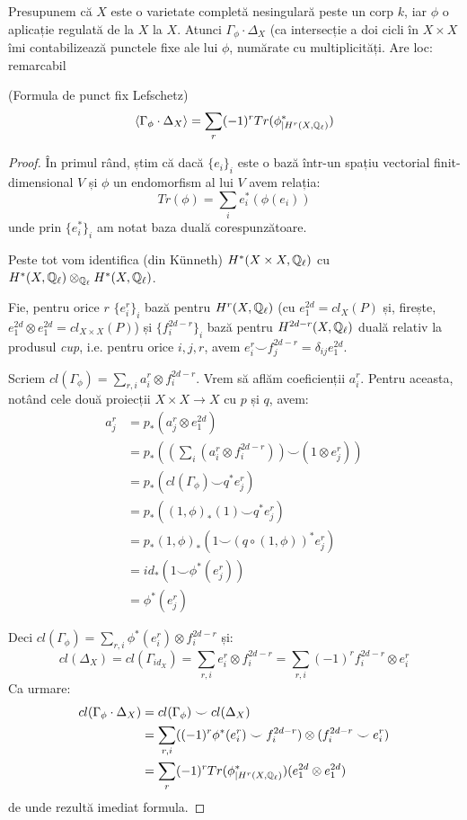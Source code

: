 \documentclass[13pt,openany]{book}
\begin{document}
Presupunem că $X$ este o varietate completă nesingulară peste un corp $k$, iar $\phi$ o aplicație regulată de la $X$ la $X$. Atunci $\Gamma_\phi \cdot \Delta_X$ (ca intersecție a doi cicli în $X \times X$ îmi contabilizează punctele fixe ale lui $\phi$, numărate cu multiplicități. Are loc:
remarcabil
\begin{teo}
(Formula de punct fix Lefschetz)
$$\langle \Gamma_\phi \cdot \Delta_X \rangle = \sum\limits_r (-1)^r Tr(\phi^*_{\mid H^r(X,\mathbb{Q}_\ell)})$$
\end{teo}

\begin{proof}
În primul rând, știm că dacă $\{e_i\}_i$ este o bază într-un spațiu vectorial finit-dimensional $V$ și $\phi$ un endomorfism al lui $V$ avem relația:
$$Tr(\phi)=\sum\limits_i e_i^*(\phi(e_i))$$
unde prin $\{e_i^*\}_i$ am notat baza duală corespunzătoare.

Peste tot vom identifica (din Künneth) $H^*(X\times X,\mathbb{Q}_\ell)$ cu $H^*(X,\mathbb{Q}_\ell) \otimes_{\mathbb{Q}_\ell} H^*(X,\mathbb{Q}_\ell)$.

Fie, pentru orice $r$ $\{e_i^r\}_i$ bază pentru $H^r(X,\mathbb{Q}_\ell)$ (cu $e^{2d}_1=cl_X(P)$ și, firește, $e^{2d}_1 \otimes e^{2d}_1 = cl_{X\times X}(P)$) și $\{f_i^{2d-r}\}_i$ bază pentru $H^{2d-r}(X,\mathbb{Q}_\ell)$ duală relativ la produsul {\it cup}, i.e. pentru orice $i,j,r$, avem $e_i^r \smile f_j^{2d-r} = \delta_{ij}e^{2d}_1$.

Scriem $cl(\Gamma_\phi)=\sum\limits_{r,i} a_i^r \otimes f_i^{2d-r}$. Vrem să aflăm coeficienții $a_i^r$. Pentru aceasta, notând cele două proiecții $X \times X \rightarrow X$ cu $p$ și $q$, avem:
\begin{align*}
a^r_j&=p_*(a^r_j \otimes e^{2d}_1)\\
&=p_* ((\sum\limits_i (a^r_i \otimes f^{2d-r}_i)) \smile (1 \otimes e^r_j)) \\
&= p_*(cl(\Gamma_\phi) \smile q^* e^r_j) \\
&= p_*( (1,\phi)_*(1) \smile q^* e^r_j) \\
&= p_* (1,\phi)_* (1 \smile (q \circ (1,\phi))^*e_j^r)\\
&= id_*(1 \smile \phi^*(e_j^r))\\
&= \phi^*(e_j^r)
\end{align*}

Deci $cl(\Gamma_\phi)=\sum\limits_{r,i} \phi^*(e^r_i) \otimes f^{2d-r}_i$ și:
$$cl(\Delta_X)=cl(\Gamma_{id_X})=\sum\limits_{r,i} e^r_i \otimes f^{2d-r}_i = \sum\limits_{r,i} (-1)^r f_i^{2d-r} \otimes e^r_i$$
Ca urmare:
\begin{align*}
cl(\Gamma_\phi \cdot \Delta_X) &= cl(\Gamma_\phi) \smile cl(\Delta_X) \\
&= \sum\limits_{r,i} ((-1)^r \phi^*(e^r_i) \smile f^{2d-r}_i) \otimes (f^{2d-r}_i \smile e^r_i) \\
&= \sum\limits_r (-1)^r Tr(\phi^*_{\mid H^r(X,\mathbb{Q}_\ell)}) (e^{2d}_1 \otimes e^{2d}_1)
\end{align*}
de unde rezultă imediat formula.
\end{proof}
\end{document}
